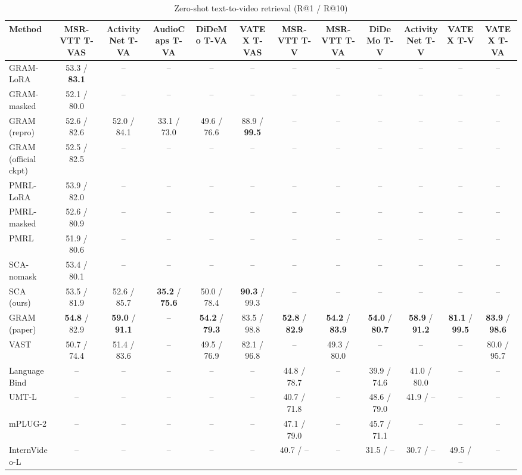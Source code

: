 \begin{table}[t]
\centering
\caption{Zero-shot text-to-video retrieval (R@1 / R@10)}
\label{tab:zeroshot_t2v}
\small
\begin{tabular}{lccccccccccc}
\toprule
Method & MSR-VTT T-VAS & ActivityNet T-VA & AudioCaps T-VA & DiDeMo T-VA & VATEX T-VAS & MSR-VTT T-V & MSR-VTT T-VA & DiDeMo T-V & ActivityNet T-V & VATEX T-V & VATEX T-VA \\
\midrule
GRAM-LoRA & 53.3 / \textbf{83.1} & -- & -- & -- & -- & -- & -- & -- & -- & -- & -- \\
GRAM-masked & 52.1 / 80.0 & -- & -- & -- & -- & -- & -- & -- & -- & -- & -- \\
GRAM (repro) & 52.6 / 82.6 & 52.0 / 84.1 & 33.1 / 73.0 & 49.6 / 76.6 & 88.9 / \textbf{99.5} & -- & -- & -- & -- & -- & -- \\
GRAM (official ckpt) & 52.5 / 82.5 & -- & -- & -- & -- & -- & -- & -- & -- & -- & -- \\
PMRL-LoRA & 53.9 / 82.0 & -- & -- & -- & -- & -- & -- & -- & -- & -- & -- \\
PMRL-masked & 52.6 / 80.9 & -- & -- & -- & -- & -- & -- & -- & -- & -- & -- \\
PMRL & 51.9 / 80.6 & -- & -- & -- & -- & -- & -- & -- & -- & -- & -- \\
SCA-nomask & 53.4 / 80.1 & -- & -- & -- & -- & -- & -- & -- & -- & -- & -- \\
SCA (ours) & 53.5 / 81.9 & 52.6 / 85.7 & \textbf{35.2} / \textbf{75.6} & 50.0 / 78.4 & \textbf{90.3} / 99.3 & -- & -- & -- & -- & -- & -- \\
GRAM (paper) & \textbf{54.8} / 82.9 & \textbf{59.0} / \textbf{91.1} & -- & \textbf{54.2} / \textbf{79.3} & 83.5 / 98.8 & \textbf{52.8} / \textbf{82.9} & \textbf{54.2} / \textbf{83.9} & \textbf{54.0} / \textbf{80.7} & \textbf{58.9} / \textbf{91.2} & \textbf{81.1} / \textbf{99.5} & \textbf{83.9} / \textbf{98.6} \\
VAST & 50.7 / 74.4 & 51.4 / 83.6 & -- & 49.5 / 76.9 & 82.1 / 96.8 & -- & 49.3 / 80.0 & -- & -- & -- & 80.0 / 95.7 \\
LanguageBind & -- & -- & -- & -- & -- & 44.8 / 78.7 & -- & 39.9 / 74.6 & 41.0 / 80.0 & -- & -- \\
UMT-L & -- & -- & -- & -- & -- & 40.7 / 71.8 & -- & 48.6 / 79.0 & 41.9 / -- & -- & -- \\
mPLUG-2 & -- & -- & -- & -- & -- & 47.1 / 79.0 & -- & 45.7 / 71.1 & -- & -- & -- \\
InternVideo-L & -- & -- & -- & -- & -- & 40.7 / -- & -- & 31.5 / -- & 30.7 / -- & 49.5 / -- & -- \\

\end{tabular}
\end{table}
